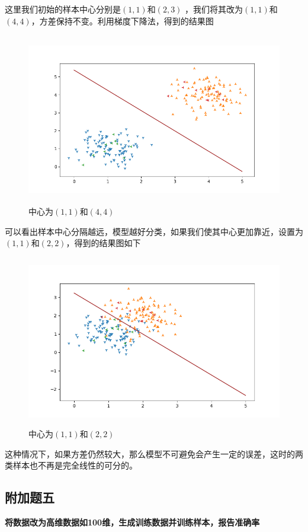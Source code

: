 \documentclass{article}
\begin{document}
 
这里我们初始的样本中心分别是$(1,1)$和$(2,3)$ ，我们将其改为$(1,1)$和$(4,4)$，方差保持不变。利用梯度下降法，得到的结果图
\begin{figure}[H]
    \centering
    \begin{minipage}[t]{1.0\linewidth}
        \centering
        \includegraphics[height=7.5cm]{Figure_7.png}
        \caption{中心为$(1,1)$和$(4,4)$}
    \end{minipage}
 \end{figure}
 可以看出样本中心分隔越远，模型越好分类，如果我们使其中心更加靠近，设置为$(1,1)$和$(2,2)$，得到的结果图如下
 \begin{figure}[H]
    \centering
    \begin{minipage}[t]{1.0\linewidth}
        \centering
        \includegraphics[height=7.5cm]{Figure_8.png}
        \caption{中心为$(1,1)$和$(2,2)$}
    \end{minipage}
 \end{figure}
这种情况下，如果方差仍然较大，那么模型不可避免会产生一定的误差，这时的两类样本也不再是完全线性的可分的。


\subsection*{\Large 附加题五}
 {\large\textbf{将数据改为高维数据如100维，生成训练数据并训练样本，报告准确率}}\\
\end{document}
